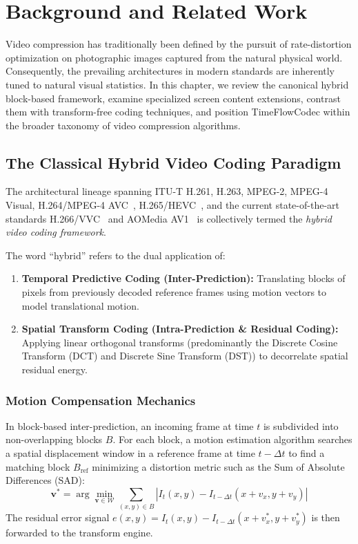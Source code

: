 \chapter{Background and Related Work}
\label{chap:related_work}

Video compression has traditionally been defined by the pursuit of rate-distortion optimization on photographic images captured from the natural physical world. Consequently, the prevailing architectures in modern standards are inherently tuned to natural visual statistics. In this chapter, we review the canonical hybrid block-based framework, examine specialized screen content extensions, contrast them with transform-free coding techniques, and position TimeFlowCodec within the broader taxonomy of video compression algorithms.

\section{The Classical Hybrid Video Coding Paradigm}
The architectural lineage spanning ITU-T H.261, H.263, MPEG-2, MPEG-4 Visual, H.264/MPEG-4 AVC~\cite{wiegand2003overview}, H.265/HEVC~\cite{sullivan2012overview}, and the current state-of-the-art standards H.266/VVC~\cite{bross2021overview} and AOMedia AV1~\cite{chen2020overview} is collectively termed the \textit{hybrid video coding framework}. 

The word ``hybrid'' refers to the dual application of:
\begin{enumerate}
    \item \textbf{Temporal Predictive Coding (Inter-Prediction):} Translating blocks of pixels from previously decoded reference frames using motion vectors to model translational motion.
    \item \textbf{Spatial Transform Coding (Intra-Prediction \& Residual Coding):} Applying linear orthogonal transforms (predominantly the Discrete Cosine Transform (DCT) and Discrete Sine Transform (DST)) to decorrelate spatial residual energy.
\end{enumerate}

\subsection{Motion Compensation Mechanics}
In block-based inter-prediction, an incoming frame at time $t$ is subdivided into non-overlapping blocks $B$. For each block, a motion estimation algorithm searches a spatial displacement window in a reference frame at time $t - \Delta t$ to find a matching block $B_{\text{ref}}$ minimizing a distortion metric such as the Sum of Absolute Differences (SAD):
\begin{equation}
    \mathbf{v}^* = \arg\min_{\mathbf{v} \in \mathcal{W}} \sum_{(x, y) \in B} |I_t(x, y) - I_{t-\Delta t}(x + v_x, y + v_y)|
\end{equation}
The residual error signal $e(x, y) = I_t(x, y) - I_{t-\Delta t}(x + v_x^*, y + v_y^*)$ is then forwarded to the transform engine.

